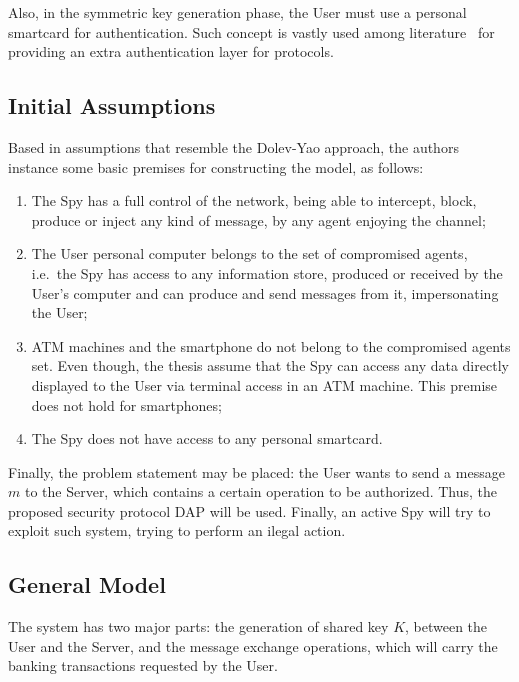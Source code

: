 Also, in the symmetric key generation phase, the User must use a personal smartcard for authentication. Such concept is vastly used among literature~\cite{ShoupRubin96} for providing an extra authentication layer for protocols.



\subsection{Initial Assumptions}
Based in assumptions that resemble the Dolev-Yao approach, the authors instance some basic premises for constructing the model, as follows:

\begin{enumerate}
  \item The Spy has a full control of the network, being able to intercept, block, produce or inject any kind of message, by any agent enjoying the channel;

  \item The User personal computer belongs to the set of compromised agents, i.e.\ the Spy has access to any information store, produced or received by the User's computer and can produce and send messages from it, impersonating the User;

  \item ATM machines and the smartphone do not belong to the compromised agents set. Even though, the thesis assume that the Spy can access any data directly displayed to the User via terminal access in an ATM machine. This premise does not hold for smartphones;

  \item The Spy does not have access to any personal smartcard.
\end{enumerate}

Finally, the problem statement may be placed: the User wants to send a message \(m\) to the Server, which contains a certain operation to be authorized. Thus, the proposed security protocol DAP will be used. Finally, an active Spy will try to exploit such system, trying to perform an ilegal action.



\subsection{General Model}
The system has two major parts: the generation of shared key \(K\), between the User and the Server, and the message exchange operations, which will carry the banking transactions requested by the User.

